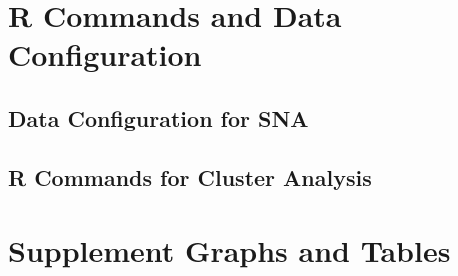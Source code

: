 \documentclass[11pt]{article}
\begin{document}
\section{R Commands and Data Configuration} \label{App:AppendixA}
\subsection{Data Configuration for SNA}

\subsection{R Commands for Cluster Analysis}


\clearpage

\section{Supplement Graphs and Tables} \label{App:AppendixB}

\end{document}
